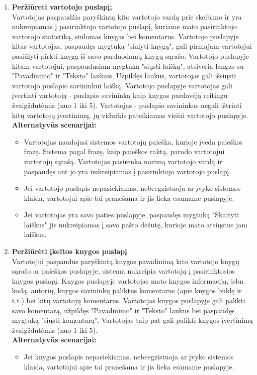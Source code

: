 \documentclass{VUMIFPSkursinis}
\begin{document}
\begin{enumerate}[label=\textbf{U\arabic*.}]
			\item \textbf{Peržiūreti vartotojo puslapį;}\\
				Vartotojas paspaudžia paryškintą kito vartotojo vardą prie skelbimo ir yra nukreipiamas į pasirinktojo vartotojo puslapį, kuriame mato pasirinktojo vartotojo statistiką, siūlomas knygas bei komentarus. 
				Vartotojo puslapyje kitas vartotojas, paspaudęs mygtuką "siulyti knygą", gali pirmajam vartotojui pasiūlyti pirkti knygą iš savo parduodamų knygų sąrašo.
				Vartotojo puslapyje kitam vartotojui, paspaudusiam mygtuką "siųsti laišką", atsiveria langas su "Pavadinimo" ir "Teksto" laukais. Užpildęs laukus, vartotojas gali išsiųsti vartotojo puslapio savininkui laišką. 
				Vartotojo puslapyje vartotojas gali įvertinti vartotoją - puslapio savininką kaip knygos pardavėją reitingu žvaigždutėmis (nuo 1 iki 5).
				Vartotojas - puslapio savininkas negali ištrinti kitų vartotojų įvertinimų, jų vidurkis pateikiamas viešai vartotojo puslapyje.\\
				\textbf{Alternatyvūs scenarijai:}
				\begin{itemize}
					\item Vartotojas naudojasi sistemos vartotojų paieška, kurioje įveda paieškos frazę. Sistema pagal frazę, kaip paieškos raktą, parodo vartotojui vartotojų sąrašą.  Vartotojas pasirenka norimą vartotojo vardą ir paspaudęs ant jo yra nukreipiamas į pasirinktojo vartotojo puslapį.
					\item Jei vartotojo puslapis nepasiekiamas, nebeegzistuoja ar įvyko sistemos klaida, vartotojui apie tai pranešama ir jis lieka esamame puslapyje.
					\item Jei vartotojas yra savo paties puslapyje, paspaudęs mygtuką "Skaityti laiškus" jis nukreipiamas į savo pašto dėžutę, kurioje mato atsiųstus jam laiškus.
				\end{itemize}
			\item \textbf{Peržiūrėti įkeltos knygos puslapį}\\
				Vartotojui paspaudus paryškintą knygos pavadinimą kito vartotojo knygų sąrašo ar paieškos puslapyje, sistema nukreipia vartotoją į pasirinktosios knygos puslapį.
				Knygos puslapyje vartotojas mato knygos informaciją, isbn kodą, autorių, knygos savininkų paliktus komentarus (apie knygos būklę ir t.t.) bei kitų vartotojų komentarus.
				Vartotojas knygos puslapyje gali palikti savo komentarą, užpildęs "Pavadinimo" ir "Teksto" laukus bei paspaudęs mygtuką "siųsti komentarą". Vartotojas taip pat gali palikti knygos įvertinimą žvaigždutėmis (nuo 1 iki 5).\\
				\textbf{Alternatyvūs scenarijai:}
				\begin{itemize}
					\item Jei knygos puslapis nepasiekiamas, nebeegzistuoja ar įvyko sistemos klaida, vartotojui apie tai pranešama ir jis lieka esamame puslapyje.
				\end{itemize}


\end{enumerate}
\end{document}
